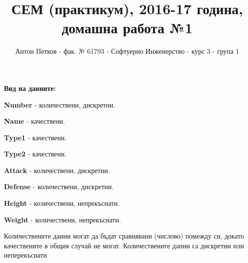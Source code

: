 \documentclass[11pt]{article}
\title{СЕМ (практикум), 2016-17 година, домашна работа №1}
\author{Антон Петков - фак. № 61793 - Софтуерно Инженерство - курс 3 - група 1}
\begin{document}
\maketitle

\textbf{Вид на данните:}

\textbf{Number} - количествени, дискретни.

\textbf{Name} - качествени.

\textbf{Type1} - качествени.

\textbf{Type2} - качествени.

\textbf{Attack} - количествени, дискретни.

\textbf{Defense} - количествени, дискретни.

\textbf{Height} - количествени, непрекъснати.

\textbf{Weight} - количествени, непрекъснати.
\newline

Количествените данни могат да бъдат сравнявани (числово) помежду си, докато качествените в общия случай не могат. Количествените данни са дискретни или неперекъснати.
\end{document}
